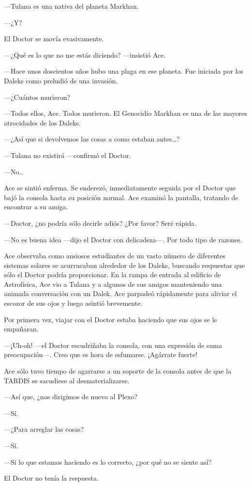 ---Tulana es una nativa del planeta Markhan.

---¿Y?

El Doctor se movía evasivamente.

---¿Qué es lo que no me estás diciendo? ---insistió Ace.

---Hace unos doscientos años hubo una plaga en ese planeta. Fue
iniciada por los Daleks como preludió de una invasión.

---¿Cuántos murieron?

---Todos ellos, Ace. Todos murieron. El Genocidio Markhan es una
de las mayores atrocidades de los Daleks.

---¿Así que si devolvemos las cosas a como estaban
antes\ldots{}?

---Tulana no existirá ---confirmó el Doctor.

---No\ldots{}

Ace se sintió enferma. Se enderezó, inmediatamente seguida por
el Doctor que bajó la consola hasta su posición normal. Ace examinó la
pantalla, tratando de encontrar a su amiga.

---Doctor, ¿no podría sólo decirle adiós? ¿Por favor? Seré
rápida.

---No es buena idea ---dijo el Doctor con delicadeza---. Por
todo tipo de razones.

Ace observaba como ansiosos estudiantes de un vasto número de
diferentes sistemas solares se acurrucaban alrededor de los Daleks,
buscando respuestas que sólo el Doctor podría proporcionar. En la rampa
de entrada al edificio de Astrofísica, Ace vio a Tulana y a algunos de
sus amigos manteniendo una animada conversación con un Dalek. Ace
parpadeó rápidamente para aliviar el escozor de sus ojos y luego asintió
brevemente.

Por primera vez, viajar con el Doctor estaba haciendo que sus
ojos se le empañaran.

---¡Uh-oh! ---el Doctor escudriñaba la consola, con una
expresión de suma preocupación---. Creo que es hora de esfumarse.
¡Agárrate fuerte!

Ace sólo tuvo tiempo de agarrarse a un soporte de la consola
antes de que la TARDIS se sacudiese al desmaterializarse.

---Así que, ¿nos dirigimos de nuevo al Plexo?

---Sí.

---¿Para arreglar las cosas?

---Sí.

---Si lo que estamos haciendo es lo correcto, ¿por qué no se
siente así?

El Doctor no tenía la respuesta.